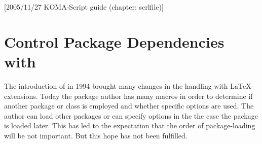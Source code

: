 %
%
%
%
%
%
%
%

[2005/11/27 KOMA-Script guide (chapter: scrlfile)]

\chapter{Control Package Dependencies with }


\begin{Explain}
  The introduction of \LaTeXe{} in 1994 brought many changes in the handling
  with \LaTeX-extensions.  Today the package author has many macros in order
  to determine if another package or class is employed and whether specific
  options are used.  The author can load other packages or can specify options
  in the the case the package is loaded later.  This has led to the
  expectation that the order of package-loading will be not important.  But
  this hope has not been fulfilled.
\end{Explain}

